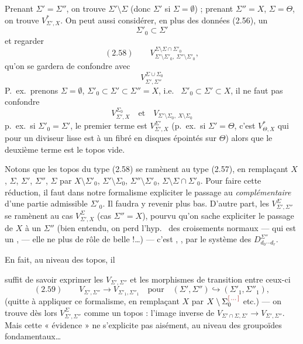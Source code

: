 \documentclass[11pt,a4paper]{article}
\begin{document}
Prenant \struck{\ill{}} $\Sigma'=\Sigma''$, on trouve $\Sigma'\setminus\Sigma$ (donc $\Sigma'$ si $\Sigma=\emptyset$) ; prenant $\Sigma''=X$, $\Sigma=\Theta$, on trouve $V^*_{\Sigma',X}$. On peut aussi considérer, en plus des données (2.56), un
\[
\Sigma'_0\subset\Sigma'
\]
et regarder
\[
(2.58)\qquad V^{\Sigma\setminus\Sigma\cap\Sigma'_0}_{\Sigma'\setminus\Sigma'_0,\ \Sigma''\setminus\Sigma'_0},
\]
 qu'on se gardera de confondre avec
\[
V^{\Sigma\cup\Sigma_0}_{\Sigma',\Sigma''}
\]
P.~ex.\ prenons $\Sigma=\emptyset$, $\Sigma'_0\subset\Sigma'\subset\Sigma''=X$, i.e.\  $\Sigma'_0\subset\Sigma'\subset X$, il ne faut pas confondre
\[
V^{\Sigma_0}_{\Sigma',X}\quad\text{et}\quad V_{\Sigma'\setminus\Sigma_0,\ X\setminus\Sigma_0}
\]
p.~ex.\ si $\Sigma'_0=\Sigma'$, le premier terme est $V^{\Sigma'}_{\Sigma',X}$ (p.~ex.\ si $\Sigma'=\Theta$, c'est $V^*_{\Theta,X}$ \struck{\ill{}} qui pour un diviseur lisse est \struck{\ill{}}  à un fibré en disques épointés sur $\Theta$) alors que le deuxième terme est le topos vide.

Notons que les topos du type (2.58) se ramènent au type (2.57), en remplaçant $X$, \struck{\ill{}} $\Sigma$, $\Sigma'$, $\Sigma''$, $\Sigma$ par \struck{\ill{}} $X\setminus\Sigma'_0$, $\Sigma'\setminus\Sigma_0$, $\Sigma''\setminus\Sigma'_0$, $\Sigma\setminus\Sigma\cap\Sigma'_0$. Pour faire cette réduction, il faut dans notre formalisme  expliciter
le passage au \emph{complémentaire} d'une partie admissible $\Sigma'_0$. Il faudra y revenir plus bas. D'autre part, les $V^{\Sigma}_{\Sigma',\Sigma''}$ se ramènent au cas $V^\Sigma_{\Sigma',X}$ (cas $\Sigma''=X$), pourvu qu'on sache expliciter le passage de $X$ à un $\Sigma''$ (bien entendu, on perd l'hyp.\  des croisements normaux — qui est un  \ill{}, — elle ne  plus de rôle de  belle  !\ldots) — c'est , , par le système des $D^{\Sigma''}_{d_0\cdots d_r}$. \struck{\ill{}}

En fait, au niveau des topos, il

suffit  de savoir exprimer les $V_{\Sigma',\Sigma''}$ et les morphismes de transition entre ceux-ci
\[
(2.59)\qquad V_{\Sigma',\Sigma''}\longrightarrow V_{\Sigma'_1,\Sigma''_1}\quad\text{pour}\quad(\Sigma',\Sigma'')\hookrightarrow(\Sigma'_1,\Sigma''_1),
\]
(quitte à appliquer ce formalisme, en remplaçant $X$ par $X\setminus\Sigma_0^{\ill{}}$ etc.) — on trouve dès lors $V^\Sigma_{\Sigma',\Sigma''}$ comme un topos    : l'image inverse de \struck{\ill{}}   $V_{\Sigma'\cap\Sigma,\Sigma'}\longrightarrow V_{\Sigma',\Sigma''}$.
Mais cette « évidence » ne s'explicite pas aisément, au niveau des groupoïdes fondamentaux\ldots
\end{document}
